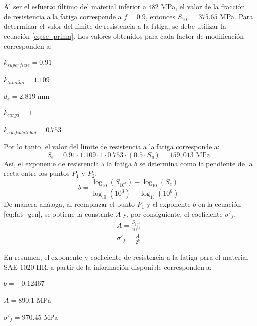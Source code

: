 Al ser el esfuerzo último del material inferior a 482 MPa, el valor de la fracción de resistencia a la fatiga corresponde a $f = 0.9$, entonces $S_{10^3} = 376.65$ MPa.
\newpage
Para determinar el valor del límite de resistencia a la fatiga, se debe utilizar la ecuación \ref{eq:se_prima}. Los valores obtenidos para cada factor de modificación corresponden a:
\begin{itemize*}
	\item $k_{superficie} = 0.91$
	\item $k_{tama\tilde{n}o} = 1.109$
	\begin{itemize*}
		\item $d_e = 2.819$ mm
	\end{itemize*}
	\item $k_{carga} = 1$
	\item $k_{confiabilidad} = 0.753$
\end{itemize*} 
Por lo tanto, el valor del límite de resistencia a la fatiga corresponde a:
\begin{equation}
	S_e = 0.91 \cdot 1.109 \cdot 1 \cdot 0.753 \cdot (0.5 \cdot S_u) = 159,013 \text{ MPa}
\end{equation}
Así, el exponente de resistencia a la fatiga $b$ se determina como la pendiente de la recta entre los puntos $P_1$ y $P_2$:
\begin{equation}
	b = \frac{\log_{10} (S_{10^3}) - \log_{10} (S_e)}{\log_{10} (10^3) - \log_{10} (10^6)}
\end{equation}
De manera análoga, al reemplazar el punto $P_1$ y el exponente $b$ en la ecuación \ref{eq:fat_gen}, se obtiene la constante $A$ y, por consiguiente, el coeficiente $\sigma'_f$.
\begin{gather}
	A = \frac{S_{10^3}}{10^{3b}} \\
	\sigma'_f = \frac{A}{2^b}
\end{gather}

En resumen, el exponente y coeficiente de resistencia a la fatiga para el material SAE 1020 HR, a partir de la información disponible corresponden a:
\begin{itemize*}
	\item $b = -0.12467$ 
	\item $A = 890.1$ MPa
	\item $\sigma'_f = 970.45$ MPa
\end{itemize*}
